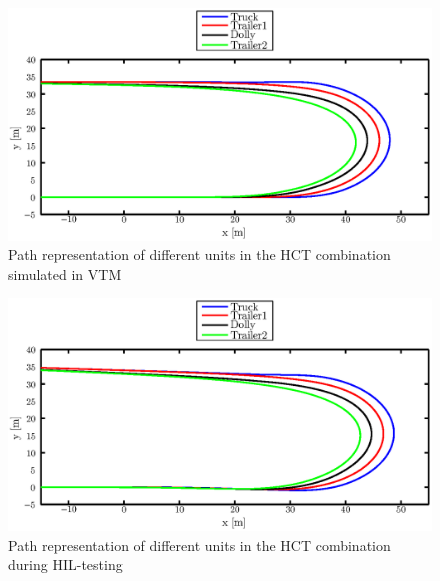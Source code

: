 \documentclass[ExampleMasters.tex]{subfiles}
\begin{document}
\begin{figure}[!htb]
	\centering
	\includegraphics[width=1\linewidth]{figures/xy_VTM}
	\caption{Path representation of different units in the \acrshort{HCT} combination simulated in \acrshort{VTM}}
	
	\label{fig:xy_VTM}
\end{figure}
\begin{figure}[!htb]
	\centering
	\includegraphics[width=1\linewidth]{figures/xy_HIL}
	\caption{Path representation of different units in the \acrshort{HCT} combination during \acrlong{HIL}-testing}
	
	\label{fig:xy_HIL}
\end{figure}  
 

  
  
 
\end{document}
